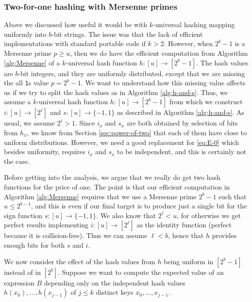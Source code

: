 \subsubsection{Two-for-one hashing with  Mersenne primes}\label{sec:two-for-one}
Above we discussed how useful it would be with $k$-universal hashing
mapping uniformly into $b$-bit strings. The issue was that the lack of
efficient implementations with standard portable code if
$k>2$. However, when $2^b-1$ is a Mersenne prime $p\geq u$, then we do
have the efficient computation from Algorithm \ref{alg:Mersenne}
of a $k$-universal hash function $h:[u]\to[2^b-1]$. The hash values
are $b$-bit integers, and they are uniformly distributed, except that
we are missing the all \texttt{1}s value $p=2^b-1$. We want to
understand how this missing value affects us if we try to split the
hash values as in Algorithm \ref{alg:h-and-s}. Thus, we assume a
$k$-universal hash function $h:[u]\to[2^b-1]$ from which we construct
$i:[u]\to[2^\ell]$ and $s:[u]\to\{-1,1\}$ as
described in Algorithm \ref{alg:h-and-s}. As usual, we assume $2^\ell>1$.
Since $i_x$ and $s_x$ are
both obtained by selection of bits from $h_x$, we know from Section
\ref{sec:power-of-two} that each of them have close to uniform
distributions. However, we need a good replacement for \eqref{eq:E-0}
which besides uniformity, requires $i_x$ and $s_x$ to be independent,
and this is certainly not the case.

Before getting into the analysis, we argue that we really do get two
hash functions for the price of one. The point is that our efficient
computation in Algorithm \ref{alg:Mersenne} requires that we use a
Mersenne prime $2^b-1$ such that $u\leq 2^{b-1}$, and this is even if
our final target is to produce just a single bit for the sign function
$s:[u]\to\{-1,1\}$. We also know that $2^\ell<u$, for otherwise we
get perfect results implementing $i:[u]\to[2^\ell]$ as the identity
function (perfect because it is collision-free).  Thus we can assume
$\ell<b$, hence that $h$ provides enough bits for both $s$ and $i$.


We now consider the effect of the hash values from $h$ being uniform
in $[2^b-1]$ instead of in $[2^b]$. Suppose we want to compute the
expected value of an expression $B$ depending only on the independent
hash values $h(x_0),\ldots,h(x_{j - 1})$ of $j\leq k$ distinct keys
$x_0,\ldots,x_{j - 1}$.


